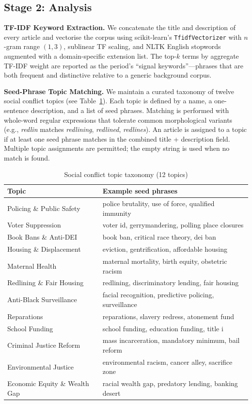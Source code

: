 \documentclass[sigconf,anonymous]{acmart}
\begin{document}
\subsection{Stage 2: Analysis}

\noindent\textbf{TF-IDF Keyword Extraction.}
We concatenate the title and description of every article and vectorise the
corpus using scikit-learn's \texttt{TfidfVectorizer} with $n$-gram range
$(1,3)$, sublinear TF scaling, and NLTK English stopwords augmented with a
domain-specific extension list.
The top-$k$ terms by aggregate TF-IDF weight are reported as the period's
``signal keywords''---phrases that are both frequent and distinctive relative to
a generic background corpus.

\noindent\textbf{Seed-Phrase Topic Matching.}
We maintain a curated taxonomy of twelve social conflict topics (see
Table~\ref{tab:topics}).
Each topic is defined by a name, a one-sentence description, and a list of seed
phrases.
Matching is performed with whole-word regular expressions that tolerate common
morphological variants (e.g., \emph{redlin} matches \emph{redlining},
\emph{redlined}, \emph{redlines}).
An article is assigned to a topic if at least one seed phrase matches in the
combined title + description field.
Multiple topic assignments are permitted; the empty string is used when no
match is found.

\begin{table}[h]
\caption{Social conflict topic taxonomy (12 topics)}
\label{tab:topics}
\small
\begin{tabular}{ll}
\toprule
\textbf{Topic} & \textbf{Example seed phrases} \\
\midrule
Policing \& Public Safety     & police brutality, use of force, qualified immunity \\
Voter Suppression             & voter id, gerrymandering, polling place closures \\
Book Bans \& Anti-DEI         & book ban, critical race theory, dei ban \\
Housing \& Displacement       & eviction, gentrification, affordable housing \\
Maternal Health               & maternal mortality, birth equity, obstetric racism \\
Redlining \& Fair Housing     & redlining, discriminatory lending, fair housing \\
Anti-Black Surveillance       & facial recognition, predictive policing, surveillance \\
Reparations                   & reparations, slavery redress, atonement fund \\
School Funding                & school funding, education funding, title i \\
Criminal Justice Reform       & mass incarceration, mandatory minimum, bail reform \\
Environmental Justice         & environmental racism, cancer alley, sacrifice zone \\
Economic Equity \& Wealth Gap & racial wealth gap, predatory lending, banking desert \\
\bottomrule
\end{tabular}
\end{table}
\end{document}
